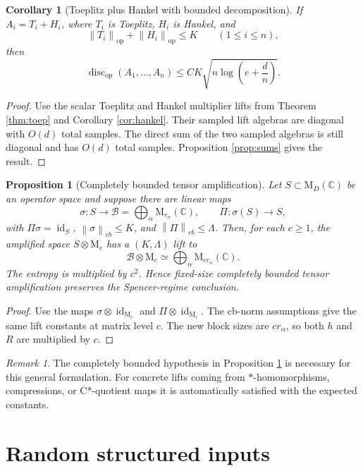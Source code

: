 \documentclass[11pt]{amsart}
\numberwithin{equation}{section}
\newtheorem{proposition}[theorem]{Proposition}
\newtheorem{corollary}[theorem]{Corollary}
\theoremstyle{definition}
\theoremstyle{remark}
\newtheorem{remark}[theorem]{Remark}
\newcommand{\C}{\mathbb C}
\newcommand{\M}{\mathrm M}
\newcommand{\op}{\mathrm{op}}
\newcommand{\discop}{\operatorname{disc}_{\op}}
\newcommand{\norm}[1]{\left\lVert #1\right\rVert}
\newcommand{\mcB}{\mathcal B}
\begin{document}
\begin{corollary}[Toeplitz plus Hankel with bounded decomposition]
If $A_i=T_i+H_i$, where $T_i$ is Toeplitz, $H_i$ is Hankel, and
\[
\norm{T_i}_{\op}+\norm{H_i}_{\op}\le K
\qquad(1\le i\le n),
\]
then
\[
\discop(A_1,\ldots,A_n)
\le CK\sqrt{n\log\left(e+\frac{d}{n}\right)} .
\]
\end{corollary}

\begin{proof}
Use the scalar Toeplitz and Hankel multiplier lifts from Theorem
\ref{thm:toep} and Corollary \ref{cor:hankel}. Their sampled lift
algebras are diagonal with $O(d)$ total samples. The direct sum of the two
sampled algebras is still diagonal and has $O(d)$ total samples. Proposition
\ref{prop:sums} gives the result.
\end{proof}

\begin{proposition}[Completely bounded tensor amplification]\label{prop:cb}
Let $S\subset\M_D(\C)$ be an operator space and suppose there are linear maps
\[
\sigma:S\to\mcB=\bigoplus_\alpha\M_{r_\alpha}(\C),
\qquad
\Pi:\sigma(S)\to S,
\]
with $\Pi\sigma=\operatorname{id}_S$, $\norm{\sigma}_{cb}\le K$, and
$\norm{\Pi}_{cb}\le\Lambda$. Then, for each $c\ge1$, the amplified space
$S\otimes\M_c$ has a $(K,\Lambda)$ lift to
\[
\mcB\otimes\M_c\simeq\bigoplus_\alpha\M_{cr_\alpha}(\C).
\]
The entropy is multiplied by $c^2$. Hence fixed-size completely bounded tensor
amplification preserves the Spencer-regime conclusion.
\end{proposition}

\begin{proof}
Use the maps $\sigma\otimes\operatorname{id}_{\M_c}$ and
$\Pi\otimes\operatorname{id}_{\M_c}$. The cb-norm assumptions give the same
lift constants at matrix level $c$. The new block sizes are $cr_\alpha$, so both
$h$ and $R$ are multiplied by $c$.
\end{proof}

\begin{remark}
The completely bounded hypothesis in Proposition \ref{prop:cb} is necessary
for this general formulation. For concrete lifts coming from $*$-homomorphisms,
compressions, or C*-quotient maps it is automatically satisfied with the
expected constants.
\end{remark}

\section{Random structured inputs}
\end{document}
